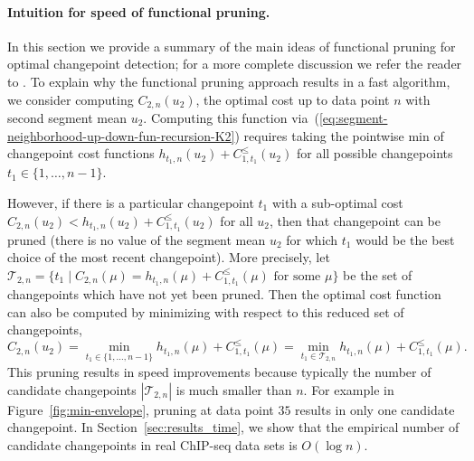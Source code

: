 \documentclass[twoside,11pt]{article}
\begin{document}
\paragraph{Intuition for speed of functional pruning.} 
In this section we provide a summary of the main ideas of functional
pruning for optimal changepoint detection; for a more complete
discussion we refer the reader to \citep{fpop}. To explain why
the functional pruning approach results in a fast algorithm, we
consider computing $C_{2,n}(u_2)$, the optimal cost up to data point
$n$ with second segment mean $u_2$. Computing this function
via~(\ref{eq:segment-neighborhood-up-down-fun-recursion-K2}) requires
taking the pointwise min of changepoint cost functions
$h_{t_1,n}(u_2)+C_{1,t_1}^\leq(u_2)$ for all possible changepoints
$t_1\in\{1,\dots,n-1\}$.

However, if there is a particular changepoint $t_1$ with a sub-optimal cost $C_{2,n}(u_2)<h_{t_1,n}(u_2)+C_{1,t_1}^\leq(u_2)$ for all $u_2$,
then that changepoint can be pruned (there is no value of the segment
mean $u_2$ for which $t_1$ would be the best choice of the most
recent changepoint). More precisely, let
$\mathcal T_{2,n}=\{ t_1\mid C_{2,n}(\mu)=h_{t_1,n}(\mu)+C_{1,t_1}^\leq(\mu)
\text{ for some $\mu$} \}$ be the set of changepoints which have not
yet been pruned.  Then the optimal cost function can also be computed
by minimizing with respect to this reduced set of changepoints,
\begin{equation}
  C_{2,n}(u_2) = 
\min_{t_1\in\{1,\dots,n-1\}}
h_{t_1,n}(\mu)+C_{1,t_1}^\leq(\mu)
=
\min_{t_1\in\mathcal T_{2,n}}
h_{t_1,n}(\mu)+C_{1,t_1}^\leq(\mu).
\end{equation}
This pruning results in speed improvements because typically the
number of candidate changepoints $|\mathcal T_{2,n}|$ is much smaller
than $n$. For example in Figure~\ref{fig:min-envelope}, pruning at
data point $35$ results in only one candidate changepoint. In
Section~\ref{sec:results_time}, we show that the empirical number of
candidate changepoints in real ChIP-seq data sets is $O(\log n)$.
\end{document}
